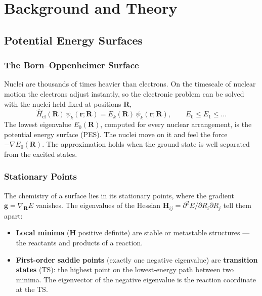 \newpage
\chapter{Background and Theory}

\section{Potential Energy Surfaces}
\label{sec:background-pes}

\subsection{The Born--Oppenheimer Surface}
\label{sec:background-bo}

Nuclei are thousands of times heavier than electrons. On the timescale of
nuclear motion the electrons adjust instantly, so the electronic problem can
be solved with the nuclei held fixed at positions $\mathbf{R}$,
\begin{equation}
  \hat{H}_\text{el}(\mathbf{R})\, \psi_k(\mathbf{r};\mathbf{R})
  = E_k(\mathbf{R})\, \psi_k(\mathbf{r};\mathbf{R}),
  \qquad E_0 \le E_1 \le \dots
  \label{eq:electronic-schrodinger}
\end{equation}
The lowest eigenvalue $E_0(\mathbf{R})$, computed for every nuclear
arrangement, is the potential energy surface (PES). The nuclei move on it and
feel the force $-\nabla E_0(\mathbf{R})$. The approximation holds when the
ground state is well separated from the excited states.

\subsection{Stationary Points}
\label{sec:background-stationary}

The chemistry of a surface lies in its stationary points, where the gradient
$\mathbf{g} = \nabla_\mathbf{R} E$ vanishes. The eigenvalues of the Hessian
$\mathbf{H}_{ij} = \partial^2 E / \partial R_i \partial R_j$ tell them apart:

\begin{itemize}
  \item \textbf{Local minima} ($\mathbf{H}$ positive definite) are stable or
    metastable structures --- the reactants and products of a reaction.
  \item \textbf{First-order saddle points} (exactly one negative eigenvalue)
    are \textbf{transition states} (TS): the highest point on the
    lowest-energy path between two minima. The eigenvector of the negative
    eigenvalue is the reaction coordinate at the TS.
\end{itemize}

